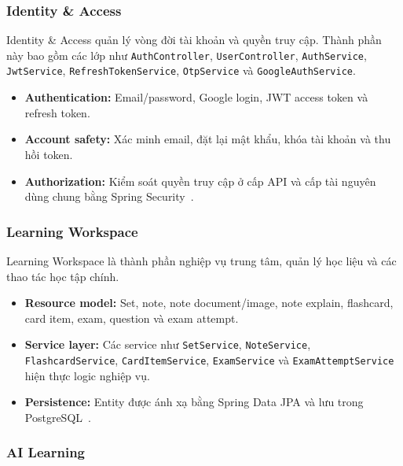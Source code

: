 \subsubsection{Identity \& Access}
\label{subsubsec:identity-access-component}

Identity \& Access quản lý vòng đời tài khoản và quyền truy cập. Thành phần này bao gồm các lớp như \texttt{AuthController}, \texttt{UserController}, \texttt{AuthService}, \texttt{JwtService}, \texttt{RefreshTokenService}, \texttt{OtpService} và \texttt{GoogleAuthService}.

\begin{itemize}
    \item \textbf{Authentication:} Email/password, Google login, JWT access token và refresh token.
    \item \textbf{Account safety:} Xác minh email, đặt lại mật khẩu, khóa tài khoản và thu hồi token.
    \item \textbf{Authorization:} Kiểm soát quyền truy cập ở cấp API và cấp tài nguyên dùng chung bằng Spring Security~\cite{springsecurityjwt}.
\end{itemize}

\subsubsection{Learning Workspace}
\label{subsubsec:learning-workspace-component}

Learning Workspace là thành phần nghiệp vụ trung tâm, quản lý học liệu và các thao tác học tập chính.

\begin{itemize}
    \item \textbf{Resource model:} Set, note, note document/image, note explain, flashcard, card item, exam, question và exam attempt.
    \item \textbf{Service layer:} Các service như \texttt{SetService}, \texttt{NoteService}, \texttt{FlashcardService}, \texttt{CardItemService}, \texttt{ExamService} và \texttt{ExamAttemptService} hiện thực logic nghiệp vụ.
    \item \textbf{Persistence:} Entity được ánh xạ bằng Spring Data JPA và lưu trong PostgreSQL~\cite{springdatajpa,postgresqlabout}.
\end{itemize}

\subsubsection{AI Learning}
\label{subsubsec:ai-learning-component}

